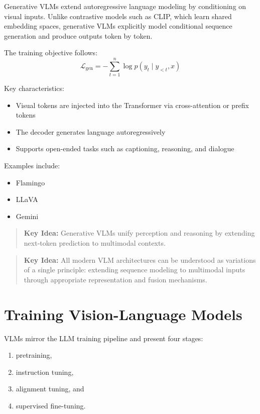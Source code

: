 \documentclass{article}
\newenvironment{keyidea}{\begin{quote}\noindent\textbf{Key Idea:} }{\end{quote}}
\begin{document}
Generative VLMs extend autoregressive language modeling by conditioning on visual inputs. Unlike contrastive models such as CLIP, which learn shared embedding spaces, generative VLMs explicitly model conditional sequence generation and produce outputs token by token.

The training objective follows:
\begin{equation}
    \mathcal{L}_{\text{gen}} = - \sum_{t=1}^{n} \log p(y_t \mid y_{<t}, x)
\end{equation}

Key characteristics:
\begin{itemize}
    \item Visual tokens are injected into the Transformer via cross-attention or prefix tokens
    \item The decoder generates language autoregressively
    \item Supports open-ended tasks such as captioning, reasoning, and dialogue
\end{itemize}

Examples include:
\begin{itemize}
    \item Flamingo
    \item LLaVA
    \item Gemini
\end{itemize}

\begin{keyidea}
Generative VLMs unify perception and reasoning by extending next-token prediction to multimodal contexts.
\end{keyidea}

\begin{keyidea}
All modern VLM architectures can be understood as variations of a single principle: extending sequence modeling to multimodal inputs through appropriate representation and fusion mechanisms.
\end{keyidea}

\section{Training Vision-Language Models}

VLMs mirror the LLM training pipeline and present four stages:
\begin{enumerate}
    \item pretraining,
    \item instruction tuning,
    \item alignment tuning, and
    \item supervised fine-tuning.
\end{enumerate}
\end{document}
